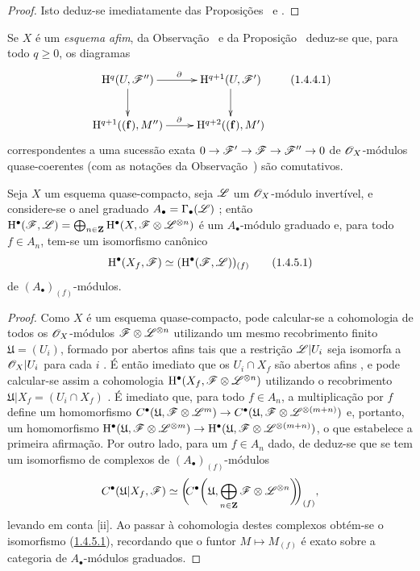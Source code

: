 \begin{proof}
Isto deduz-se imediatamente das Proposições~ e .
\end{proof}

\begin{env}[1.4.4]
\label{III.1.4.4}
Se $X$ é um \emph{esquema afim}, da Observação~ e da Proposição~ deduz-se que, para todo $q\geq 0$, os diagramas
\[
  \xymatrix{
    \HH^q(U,\sh{F}'')\ar[r]^\partial\ar[d] &
    \HH^{q+1}(U,\sh{F}')\ar[d]\\
    \HH^{q+1}((\mathbf{f}),M'')\ar[r]^\partial &
    \HH^{q+2}((\mathbf{f}),M')
  }
  \tag{1.4.4.1}
\]
correspondentes a uma sucessão exata $0\to\sh{F}'\to\sh{F}\to\sh{F}''\to 0$ de $\mathscr{O}_X$-módulos quase-coerentes (com as notações da Observação~) são comutativos.
\end{env}

\begin{proposition}[1.4.5]
\label{III.1.4.5}
Seja $X$ um esquema quase-compacto, seja $\mathscr{L}$ um $\mathscr{O}_X$-módulo invertível, e considere-se o anel graduado $A_\bullet=\Gamma_\bullet(\mathscr{L})$ ; então $\mathrm{H}^\bullet(\mathscr{F},\mathscr{L})=\bigoplus_{n\in\mathbf{Z}}\mathrm{H}^\bullet(X,\mathscr{F}\otimes\mathscr{L}^{\otimes n})$ é um $A_\bullet$-módulo graduado e, para todo $f\in A_n$, tem-se um isomorfismo canônico
\[
  \HH^\bullet(X_f,\sh{F})\isoto(\HH^\bullet(\sh{F},\sh{L}))_{(f)}
  \tag{1.4.5.1}\label{III.1.4.5.1}
\]
de $(A_\bullet)_{(f)}$-módulos.
\end{proposition}

\begin{proof}
Como $X$ é um esquema quase-compacto, pode calcular-se a cohomologia de todos os $\mathscr{O}_X$-módulos $\mathscr{F}\otimes\mathscr{L}^{\otimes n}$ utilizando um mesmo recobrimento finito $\mathfrak{U}=(U_i)$, formado por abertos afins tais que a restrição $\mathscr{L}|U_i$ seja isomorfa a $\mathscr{O}_X|U_i$ para cada $i$ .
É então imediato que os $U_i\cap X_f$ são abertos afins , e pode calcular-se assim a cohomologia $\mathrm{H}^\bullet(X_f,\mathscr{F}\otimes\mathscr{L}^{\otimes n})$ utilizando o recobrimento $\mathfrak{U}|X_f=(U_i\cap X_f)$ .
É imediato que, para todo $f\in A_n$, a multiplicação por $f$ define um homomorfismo $C^\bullet(\mathfrak{U},\sh{F}\otimes\sh{L}^m)\to C^\bullet(\mathfrak{U},\sh{F}\otimes\sh{L}^{\otimes(m+n)})$ e, portanto, um homomorfismo $\HH^\bullet(\mathfrak{U},\sh{F}\otimes\sh{L}^{\otimes m})\to\HH^\bullet(\mathfrak{U},\sh{F}\otimes\sh{L}^{\otimes(m+n)})$, o que estabelece a primeira afirmação.
Por outro lado, para um $f\in A_n$ dado, de  deduz-se que se tem um isomorfismo de complexos de $(A_\bullet)_{(f)}$-módulos
\[
  C^\bullet(\mathfrak{U}|X_f,\mathscr{F})\simeq\bigg(\!\!C^\bullet\bigg(\mathfrak{U},\bigoplus_{n\in\mathbf{Z}}\mathscr{F}\otimes\mathscr{L}^{\otimes n}\bigg)\!\!\bigg)_{(f)},
\]
levando em conta [ii].
Ao passar à cohomologia destes complexos obtém-se o isomorfismo (\hyperref[III.1.4.5.1]{1.4.5.1}), recordando que o funtor $M\mapsto M_{(f)}$ é exato sobre a categoria de $A_\bullet$-módulos graduados.
\end{proof}

